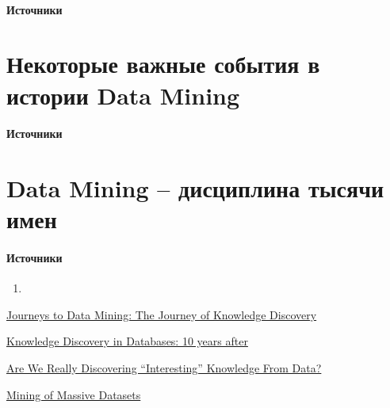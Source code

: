 \documentclass[10pt,a4paper]{article}
\begin{document}
\paragraph{Источники} \cite{mmds}


\section{Некоторые важные события в истории Data Mining}

\paragraph{Источники} \cite{journeys}


\section{Data Mining -- дисциплина тысячи имен}

\paragraph{Источники} \cite{journeys}

\begin{enumerate}
\item 
\end{enumerate}


\begin{thebibliography}{10} 

 \href{http://citeseerx.ist.psu.edu/viewdoc/download?doi=10.1.1.363.1177&rep=rep1&type=pdf}{Journeys to Data Mining: The Journey of Knowledge Discovery}

 \href{http://www.kdnuggets.com/gpspubs/sigkdd-explorations-kdd-10-years.html}{Knowledge Discovery in Databases: 10 years after}

 \href{http://www.pantaneto.co.uk/issue30/Freitas.htm}{Are We Really Discovering ``Interesting'' Knowledge From Data?}

 \href{http://infolab.stanford.edu/~ullman/mmds/book.pdf}{Mining of Massive Datasets}

\end{thebibliography}
\end{document}
